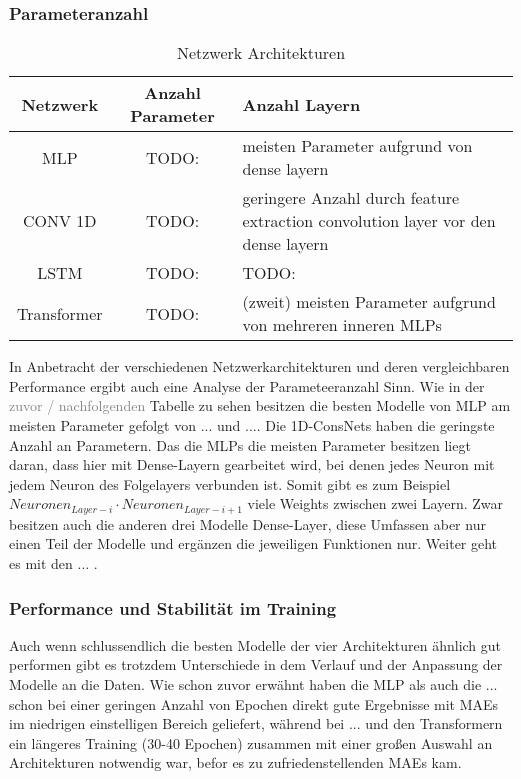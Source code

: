 \documentclass[manuscript,screen,review]{acmart} %
\begin{document}
\subsubsection{Parameteranzahl}
\begin{table}
  \caption{Netzwerk Architekturen}
  \label{tab:freq}
  \begin{tabular}{ccl}
    \toprule
    Netzwerk&Anzahl Parameter&Anzahl Layern\\
    \midrule
    MLP & TODO: & meisten Parameter aufgrund von dense layern\\
    CONV 1D & TODO: & geringere Anzahl durch feature extraction convolution layer vor den dense layern\\
    LSTM & TODO: & TODO:\\
    Transformer & TODO: & (zweit) meisten Parameter aufgrund von mehreren inneren MLPs\\
  \bottomrule
\end{tabular}
\end{table}
In Anbetracht der verschiedenen Netzwerkarchitekturen und deren vergleichbaren Performance ergibt auch eine Analyse der Parameteeranzahl Sinn.
Wie in der \textcolor{gray}{zuvor / nachfolgenden} Tabelle zu sehen besitzen die besten Modelle von MLP am meisten Parameter gefolgt von ... und .... Die 1D-ConsNets haben die geringste Anzahl an Parametern. 
Das die MLPs die meisten Parameter besitzen liegt daran, dass hier mit Dense-Layern gearbeitet wird, bei denen jedes Neuron mit jedem Neuron des Folgelayers verbunden ist. Somit gibt es zum Beispiel $Neuronen_{Layer-i} \cdot Neuronen_{Layer-i+1}$ viele Weights zwischen zwei Layern. Zwar besitzen auch die anderen drei Modelle Dense-Layer, diese Umfassen aber nur einen Teil der Modelle und ergänzen die jeweiligen Funktionen nur.
Weiter geht es mit den ... .

\subsubsection{Performance und Stabilität im Training}
Auch wenn schlussendlich die besten Modelle der vier Architekturen ähnlich gut performen gibt es trotzdem Unterschiede in dem Verlauf und der Anpassung der Modelle an die Daten. Wie schon zuvor erwähnt haben die MLP als auch die ...  schon bei einer geringen Anzahl von Epochen direkt gute Ergebnisse mit MAEs im niedrigen einstelligen Bereich geliefert, während bei ... und den Transformern ein längeres Training (30-40 Epochen) zusammen mit einer großen Auswahl an Architekturen notwendig war, befor es zu zufriedenstellenden MAEs kam.
\end{document}
